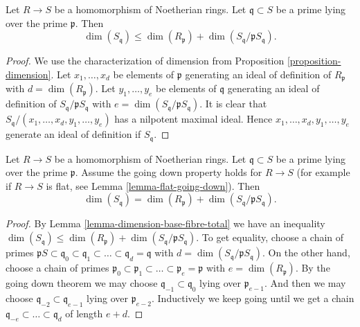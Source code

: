 \begin{lemma}
\label{lemma-dimension-base-fibre-total}
Let $R \to S$ be a homomorphism of Noetherian rings.
Let $\mathfrak q \subset S$ be a prime lying
over the prime $\mathfrak p$. Then
$$
\dim(S_{\mathfrak q})
\leq
\dim(R_{\mathfrak p})
+
\dim(S_{\mathfrak q}/\mathfrak pS_{\mathfrak q}).
$$
\end{lemma}

\begin{proof}
We use the characterization of dimension from
Proposition \ref{proposition-dimension}.
Let $x_1, \ldots, x_d$ be elements of $\mathfrak p$
generating an ideal of definition of $R_{\mathfrak p}$ with
$d = \dim(R_{\mathfrak p})$.
Let $y_1, \ldots, y_e$ be elements of $\mathfrak q$
generating an ideal of definition of
$S_{\mathfrak q}/\mathfrak pS_{\mathfrak q}$
with $e = \dim(S_{\mathfrak q}/\mathfrak pS_{\mathfrak q})$.
It is clear that $S_{\mathfrak q}/(x_1, \ldots, x_d, y_1, \ldots, y_e)$
has a nilpotent maximal ideal. Hence
$x_1, \ldots, x_d, y_1, \ldots, y_e$ generate an ideal of definition
if $S_{\mathfrak q}$.
\end{proof}

\begin{lemma}
\label{lemma-dimension-base-fibre-equals-total}
Let $R \to S$ be a homomorphism of Noetherian rings.
Let $\mathfrak q \subset S$ be a prime lying
over the prime $\mathfrak p$. Assume the going down property holds
for $R \to S$ (for example if $R \to S$ is flat, see
Lemma \ref{lemma-flat-going-down}). Then
$$
\dim(S_{\mathfrak q})
=
\dim(R_{\mathfrak p})
+
\dim(S_{\mathfrak q}/\mathfrak pS_{\mathfrak q}).
$$
\end{lemma}

\begin{proof}
By Lemma \ref{lemma-dimension-base-fibre-total}
we have an inequality
$\dim(S_{\mathfrak q}) \leq
\dim(R_{\mathfrak p}) + \dim(S_{\mathfrak q}/\mathfrak pS_{\mathfrak q})$.
To get equality, choose a chain of primes
$\mathfrak pS \subset \mathfrak q_0 \subset \mathfrak q_1 \subset \ldots
\subset \mathfrak q_d = \mathfrak q$ with
$d = \dim(S_{\mathfrak q}/\mathfrak pS_{\mathfrak q})$.
On the other hand, choose a chain of primes
$\mathfrak p_0 \subset \mathfrak p_1 \subset \ldots \subset \mathfrak p_e
= \mathfrak p$ with $e = \dim(R_{\mathfrak p})$.
By the going down theorem we may choose
$\mathfrak q_{-1} \subset \mathfrak q_0$ lying over
$\mathfrak p_{e-1}$. And then we may choose
$\mathfrak q_{-2} \subset \mathfrak q_{e-1}$ lying over
$\mathfrak p_{e-2}$. Inductively we keep going until we
get a chain
$\mathfrak q_{-e} \subset \ldots \subset \mathfrak q_d$
of length $e + d$.
\end{proof}







